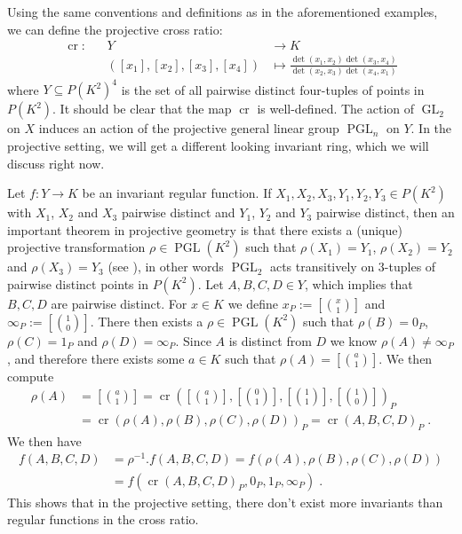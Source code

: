 Using the same conventions and definitions as in the aforementioned examples, we can define the projective cross ratio:
\begin{equation}
  \begin{aligned}
    \operatorname{cr} \colon&&Y&\longrightarrow K \\
    &&([x_1],[x_2],[x_3],[x_4]) &\longmapsto \frac{\operatorname{det}(x_1,x_2)\operatorname{det}(x_3,x_4)}{\operatorname{det}(x_2,x_3)\operatorname{det}(x_4,x_1)}
  \end{aligned}
\end{equation}
where $Y \subseteq P(K^2)^4$ is the set of all pairwise distinct four-tuples of points in $P(K^2)$.
It should be clear that the map $\operatorname{cr}$ is well-defined.
The action of $\operatorname{GL}_2$ on $X$ induces an action of the projective general linear group $\operatorname{PGL}_n$ on $Y$.
In the projective setting, we will get a different looking invariant ring, which we will discuss right now.

Let $f \colon Y \longrightarrow K$ be an invariant regular function.
If $X_1,X_2,X_3,Y_1,Y_2,Y_3 \in P(K^2)$ with $X_1$, $X_2$ and $X_3$ pairwise distinct and $Y_1$, $Y_2$ and $Y_3$ pairwise distinct, then an important theorem in projective geometry is that there exists a (unique) projective transformation $ \rho \in \operatorname{PGL}(K^2)$ such that $\rho (X_1) = Y_1$, $\rho(X_2) = Y_2$ and $\rho(X_3) = Y_3$ (see \cite[prop 5.6]{Aud03}), in other words $\operatorname{PGL}_2$ acts transitively on $3$-tuples of pairwise distinct points in $P(K^2) $.
Let $A,B,C,D \in Y$, which implies that $B,C,D$ are pairwise distinct.
For $x \in K $ we define $x_P := \left[\binom{x}{1}\right]$ and $\infty_P := \left[\binom{1}{0}\right]$.
There then exists a $\rho \in \operatorname{PGL}(K^2)$ such that $\rho (B) = 0_P$, $\rho (C) = 1_P$ and $\rho (D) = \infty_P$.
Since $A$ is distinct from $D$ we know $\rho (A) \neq \infty_P$, and therefore there exists some $a \in K$ such that $\rho(A) = [\binom{a}{1}]$.
We then compute
\begin{equation}
  \begin{aligned}
    \rho (A)
    &= \left[\binom{a}{1}\right]
    = \operatorname{cr}\left(\left[\binom{a}{1}\right],\left[\binom{0}{1}\right],\left[\binom{1}{1}\right],\left[\binom{1}{0}\right]\right)_P\\
    &= \operatorname{cr}(\rho(A),\rho(B),\rho(C),\rho(D))_P = \operatorname{cr}(A,B,C,D)_P \; .
  \end{aligned}
\end{equation}
We then have
\begin{equation}
  \begin{aligned}
    f(A,B,C,D)
    &= \rho^{-1}.f (A,B,C,D)
    = f(\rho(A),\rho(B),\rho(C),\rho(D)) \\
    &= f(\operatorname{cr}(A,B,C,D)_P,0_P,1_P,\infty_P) \; .
  \end{aligned}
\end{equation}
This shows that in the projective setting, there don't exist more invariants than regular functions in the cross ratio.

